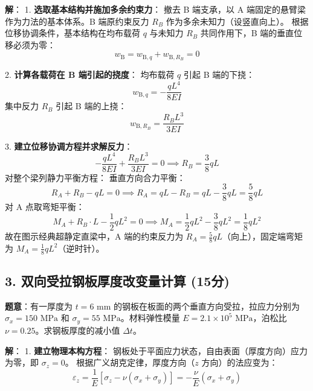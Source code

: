 \documentclass[11pt,a4paper]{ctexrep}
\begin{document}
{\begin{center}
\end{center}
\textbf{解}：
1. \textbf{选取基本结构并施加多余约束力}：
撤去 B 端支承，以 A 端固定的悬臂梁作为力法的基本体系。B 端原约束反力 $R_B$ 作为多余未知力（设竖直向上）。
根据位移协调条件，基本结构在均布载荷 $q$ 与未知力 $R_B$ 共同作用下，B 端的垂直位移必须为零：
\[
w_{\mathrm{B}} = w_{\mathrm{B}, q} + w_{\mathrm{B}, R_B} = 0
\]

2. \textbf{计算各载荷在 B 端引起的挠度}：
均布载荷 $q$ 引起 B 端的下挠：
  \[
  w_{\mathrm{B}, q} = -\frac{q L^4}{8 EI}
  \]
集中反力 $R_B$ 引起 B 端的上挠：
  \[
  w_{\mathrm{B}, R_B} = \frac{R_B L^3}{3 EI}
  \]

3. \textbf{建立位移协调方程并求解反力}：
\[
-\frac{q L^4}{8 EI} + \frac{R_B L^3}{3 EI} = 0 \implies R_B = \frac{3}{8} q L
\]
对整个梁列静力平衡方程：
垂直方向合力平衡：
  \[
  R_A + R_B - q L = 0 \implies R_A = q L - R_B = q L - \frac{3}{8} q L = \frac{5}{8} q L
  \]
对 A 点取弯矩平衡：
  \[
  M_A + R_B \cdot L - \frac{1}{2} q L^2 = 0 \implies M_A = \frac{1}{2} q L^2 - \frac{3}{8} q L^2 = \frac{1}{8} q L^2
  \]
故在图示经典超静定直梁中，A 端的约束反力为 $R_A = \frac{5}{8} q L$（向上），固定端弯矩为 $M_A = \frac{1}{8} q L^2$（逆时针）。

\subsection*{3. 双向受拉钢板厚度改变量计算 (15分)}
\textbf{题意}：有一厚度为 $t = 6\text{ mm}$ 的钢板在板面的两个垂直方向受拉，拉应力分别为 $\sigma_x = 150\text{ MPa}$ 和 $\sigma_y = 55\text{ MPa}$。材料弹性模量 $E = 2.1 \times 10^5\text{ MPa}$，泊松比 $\nu = 0.25$。求钢板厚度的减小值 $\Delta t$。

\textbf{解}：
1. \textbf{建立物理本构方程}：
钢板处于平面应力状态，自由表面（厚度方向）应力为零，即 $\sigma_z = 0$。
根据广义胡克定律，厚度方向（$z$ 方向）的法应变为：
\[
\varepsilon_z = \frac{1}{E} \left[ \sigma_z - \nu(\sigma_x + \sigma_y) \right] = -\frac{\nu}{E}(\sigma_x + \sigma_y)
\]

}
\end{document}
